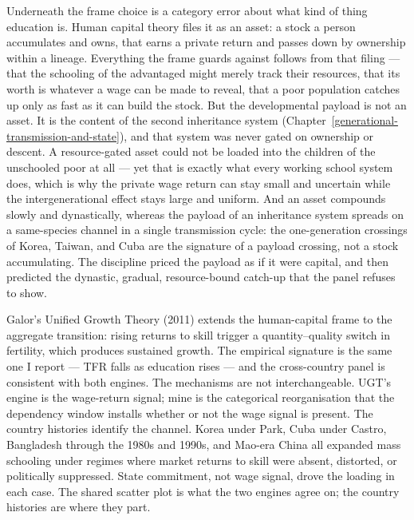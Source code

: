 \documentclass[12pt,letterpaper]{article}
\begin{document}
Underneath the frame choice is a category error about what kind of thing education is. Human capital theory files it as an asset: a stock a person accumulates and owns, that earns a private return and passes down by ownership within a lineage. Everything the frame guards against follows from that filing --- that the schooling of the advantaged might merely track their resources, that its worth is whatever a wage can be made to reveal, that a poor population catches up only as fast as it can build the stock. But the developmental payload is not an asset. It is the content of the second inheritance system (Chapter~\ref{generational-transmission-and-state}), and that system was never gated on ownership or descent. A resource-gated asset could not be loaded into the children of the unschooled poor at all --- yet that is exactly what every working school system does, which is why the private wage return can stay small and uncertain while the intergenerational effect stays large and uniform. And an asset compounds slowly and dynastically, whereas the payload of an inheritance system spreads on a same-species channel in a single transmission cycle: the one-generation crossings of Korea, Taiwan, and Cuba are the signature of a payload crossing, not a stock accumulating. The discipline priced the payload as if it were capital, and then predicted the dynastic, gradual, resource-bound catch-up that the panel refuses to show.

Galor's Unified Growth Theory (2011) extends the human-capital frame to the aggregate transition: rising returns to skill trigger a quantity--quality switch in fertility, which produces sustained growth. The empirical signature is the same one I report --- TFR falls as education rises --- and the cross-country panel is consistent with both engines. The mechanisms are not interchangeable. UGT's engine is the wage-return signal; mine is the categorical reorganisation that the dependency window installs whether or not the wage signal is present. The country histories identify the channel. Korea under Park, Cuba under Castro, Bangladesh through the 1980s and 1990s, and Mao-era China all expanded mass schooling under regimes where market returns to skill were absent, distorted, or politically suppressed. State commitment, not wage signal, drove the loading in each case. The shared scatter plot is what the two engines agree on; the country histories are where they part.
\end{document}
